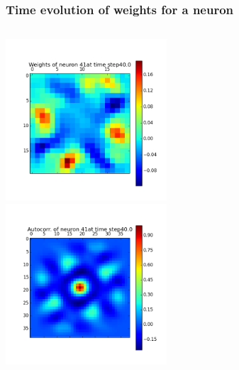 \begin{frame}
\frametitle{Time evolution of weights for a neuron}
\begin{columns}[t]
\centering
\includegraphics[width=6cm,height=6cm]{neurons/neuron_w_41_t_40.png}\\
\centering
\includegraphics[width=6cm,height=6cm]{neurons/neuron_a_41_t_40.png}\\
\end{columns}
\end{frame}

